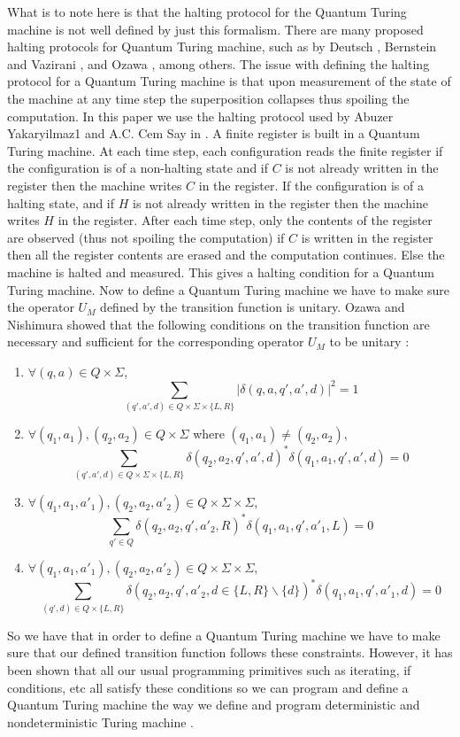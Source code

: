 \documentclass[11pt,a4paper]{article}
\begin{document}
    What is to note here is that the halting protocol for the Quantum Turing machine is not well defined by just this formalism. There are many proposed halting protocols for Quantum Turing machine, such as by Deutsch \cite{9}, Bernstein and Vazirani \cite{5}, and Ozawa \cite{1}, among others.
    The issue with defining the halting protocol for a Quantum Turing machine is that upon measurement of the state of the machine at any time step the superposition collapses thus spoiling the computation. 
    In this paper we use the halting protocol used by Abuzer Yakaryilmaz1 and A.C. Cem Say in \cite{18}. A finite register is built in a Quantum Turing machine. 
    At each time step, each configuration reads the finite register if the configuration is of a non-halting state and if $C$ is not already written in the register then the machine writes $C$ in the register.
    If the configuration is of a halting state, and if $H$ is not already written in the register then the machine writes $H$ in the register. 
    After each time step, only the contents of the register are observed (thus not spoiling the computation) if $C$ is written in the register then all the register contents are erased and the computation continues. Else the machine is halted and measured.
    This gives a halting condition for a Quantum Turing machine.
    Now to define a Quantum Turing machine we have to make sure the operator $U_M$ defined by the transition function is unitary. Ozawa and Nishimura showed that the following conditions on the transition function are necessary and sufficient for the corresponding operator $U_M$ to be unitary \cite{24}\cite{17}\cite{1}:
    \begin{enumerate}
        \item $\forall (q,a) \in Q\times \Sigma$, 
        $$\sum\limits_{(q',a',d) \in Q \times \Sigma \times \{L,R\}} |\delta(q,a,q',a',d)|^2=1$$
        \item $\forall (q_1,a_1),(q_2,a_2) \in Q\times \Sigma$ where $(q_1,a_1) \neq (q_2,a_2)$, 
        $$\sum\limits_{(q',a',d) \in Q \times \Sigma \times \{L,R\}} \delta(q_2,a_2,q',a',d)^*\delta(q_1,a_1,q',a',d) = 0$$
        \item $\forall (q_1,a_1,a'_1),(q_2,a_2,a'_2) \in Q\times \Sigma\times \Sigma$,  
        $$\sum\limits_{q'\in Q} \delta(q_2,a_2,q',a'_2,R )^*\delta(q_1,a_1,q',a'_1,L) = 0$$
        \item $\forall (q_1,a_1,a'_1),(q_2,a_2,a'_2) \in Q\times \Sigma\times \Sigma$,  
        $$\sum\limits_{(q',d)\in Q\times \{L,R\}} \delta(q_2,a_2,q',a'_2,d \in \{L,R\}\backslash \{d\})^*\delta(q_1,a_1,q',a'_1,d) = 0$$
    \end{enumerate}
    So we have that in order to define a Quantum Turing machine we have to make sure that our defined transition function follows these constraints. 
    However, it has been shown that all our usual programming primitives such as iterating, if conditions, etc all satisfy these conditions so we can program and define a Quantum Turing machine the way we define and program deterministic and nondeterministic Turing machine \cite{5}\cite{17}.
\end{document}
